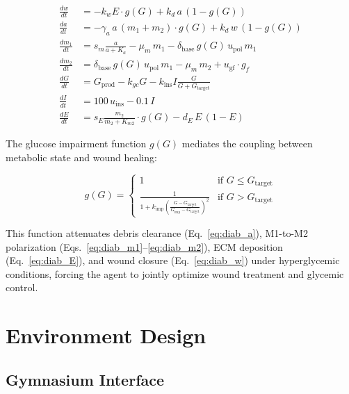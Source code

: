 \documentclass[11pt,a4paper]{article}
\begin{document}
\begin{align}
\frac{dw}{dt} &= -k_w E \cdot g(G) + k_d \, a \, (1 - g(G)) \label{eq:diab_w} \\
\frac{da}{dt} &= -\gamma_a \, a \, (m_1 + m_2) \cdot g(G) + k_d \, w \, (1 - g(G)) \label{eq:diab_a} \\
\frac{dm_1}{dt} &= s_m \frac{a}{a + K_a} - \mu_m \, m_1 - \delta_{\text{base}} \, g(G) \, u_{\text{pol}} \, m_1 \label{eq:diab_m1} \\
\frac{dm_2}{dt} &= \delta_{\text{base}} \, g(G) \, u_{\text{pol}} \, m_1 - \mu_m \, m_2 + u_{\text{gf}} \cdot g_f \label{eq:diab_m2} \\
\frac{dG}{dt} &= G_{\text{prod}} - k_{gc} G - k_{\text{ins}} I \frac{G}{G + G_{\text{target}}} \label{eq:diab_G} \\
\frac{dI}{dt} &= 100 \, u_{\text{ins}} - 0.1 \, I \label{eq:diab_I} \\
\frac{dE}{dt} &= s_E \frac{m_2}{m_2 + K_{m2}} \cdot g(G) - d_E \, E \, (1 - E) \label{eq:diab_E}
\end{align}

The glucose impairment function $g(G)$ mediates the coupling between metabolic state and wound healing:

\begin{equation}
g(G) = \begin{cases}
1 & \text{if } G \leq G_{\text{target}} \\
\frac{1}{1 + k_{\text{imp}} \left(\frac{G - G_{\text{target}}}{G_{\text{imp}} - G_{\text{target}}}\right)^2} & \text{if } G > G_{\text{target}}
\end{cases}
\label{eq:glucose_impairment}
\end{equation}

This function attenuates debris clearance (Eq.~\ref{eq:diab_a}), M1-to-M2 polarization (Eqs.~\ref{eq:diab_m1}--\ref{eq:diab_m2}), ECM deposition (Eq.~\ref{eq:diab_E}), and wound closure (Eq.~\ref{eq:diab_w}) under hyperglycemic conditions, forcing the agent to jointly optimize wound treatment and glycemic control.

\section{Environment Design}
\label{sec:env_design}

\subsection{Gymnasium Interface}
\end{document}
